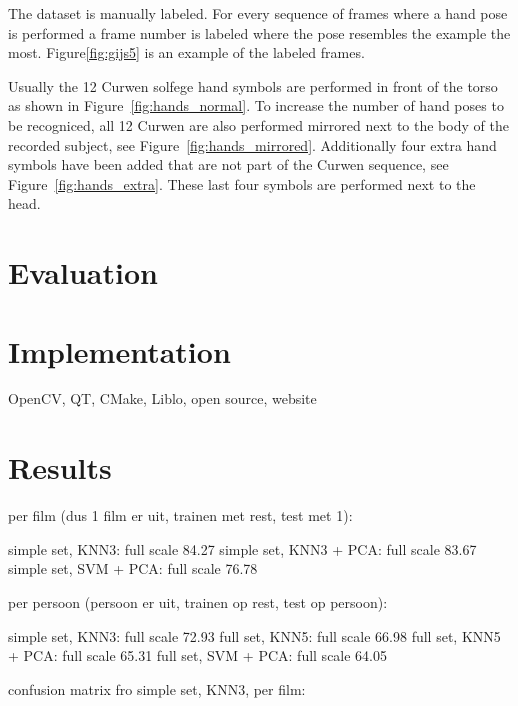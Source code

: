 The dataset is manually labeled. For every sequence of frames where a hand pose is performed a frame number is labeled where the pose resembles the example the most. Figure\ref{fig:gijs5} is an example of the labeled frames.

Usually the 12 Curwen solfege hand symbols are performed in front of the torso as shown in Figure~\ref{fig:hands_normal}. To increase the number of hand poses to be recogniced, all 12 Curwen are also performed mirrored next to the body of the recorded subject, see Figure~\ref{fig:hands_mirrored}. Additionally four extra hand symbols have been added that are not part of the Curwen sequence, see Figure~\ref{fig:hands_extra}. These last four symbols are performed next to the head.

\section{Evaluation}


\section{Implementation}
OpenCV, QT, CMake, Liblo, open source, website

\section{Results}

  per film (dus 1 film er uit, trainen met rest, test met 1):

simple set, KNN3: full scale 84.27%
simple set, KNN3 + PCA: full scale 83.67%
simple set, SVM + PCA: full scale 76.78%


  per persoon (persoon er uit, trainen op rest, test op persoon):

simple set, KNN3: full scale 72.93%
full set, KNN5: full scale 66.98%
full set, KNN5 + PCA: full scale 65.31%
full set, SVM + PCA: full scale 64.05%



confusion matrix fro simple set, KNN3, per film:

